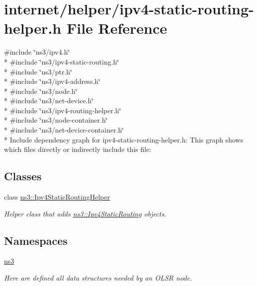 \hypertarget{ipv4-static-routing-helper_8h}{}\section{internet/helper/ipv4-\/static-\/routing-\/helper.h File Reference}
\label{ipv4-static-routing-helper_8h}
{\ttfamily \#include \char`\"{}ns3/ipv4.\+h\char`\"{}}\\*
{\ttfamily \#include \char`\"{}ns3/ipv4-\/static-\/routing.\+h\char`\"{}}\\*
{\ttfamily \#include \char`\"{}ns3/ptr.\+h\char`\"{}}\\*
{\ttfamily \#include \char`\"{}ns3/ipv4-\/address.\+h\char`\"{}}\\*
{\ttfamily \#include \char`\"{}ns3/node.\+h\char`\"{}}\\*
{\ttfamily \#include \char`\"{}ns3/net-\/device.\+h\char`\"{}}\\*
{\ttfamily \#include \char`\"{}ns3/ipv4-\/routing-\/helper.\+h\char`\"{}}\\*
{\ttfamily \#include \char`\"{}ns3/node-\/container.\+h\char`\"{}}\\*
{\ttfamily \#include \char`\"{}ns3/net-\/device-\/container.\+h\char`\"{}}\\*
Include dependency graph for ipv4-\/static-\/routing-\/helper.h\+:
This graph shows which files directly or indirectly include this file\+:
\subsection*{Classes}
\begin{DoxyCompactItemize}
\item 
class \hyperlink{classns3_1_1Ipv4StaticRoutingHelper}{ns3\+::\+Ipv4\+Static\+Routing\+Helper}
\begin{DoxyCompactList}\small\item\em Helper class that adds \hyperlink{classns3_1_1Ipv4StaticRouting}{ns3\+::\+Ipv4\+Static\+Routing} objects. \end{DoxyCompactList}\end{DoxyCompactItemize}
\subsection*{Namespaces}
\begin{DoxyCompactItemize}
\item 
 \hyperlink{namespacens3}{ns3}
\begin{DoxyCompactList}\small\item\em Here are defined all data structures needed by an O\+L\+SR node. \end{DoxyCompactList}\end{DoxyCompactItemize}

